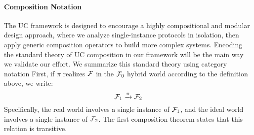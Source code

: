 \paragraph{Composition Notation}
The UC framework is designed to encourage a highly compositional and modular design approach, where we analyze single-instance protocols in isolation, then apply generic composition operators to build more complex systems.
Encoding the standard theory of UC composition in our framework will be the main way we validate our effort. We summarize this standard theory using category notation
First, if $\pi$ realizes $\mathcal{F}$ in the $\mathcal{F}_0$ hybrid world according to the definition above, we write:
\[
	\mathcal{F}_1 \xrightarrow{\pi} \mathcal{F}_2
\]
Specifically, the real world involves a single instance of $\mathcal{F}_1$, and the ideal world involves a single instance of $\mathcal{F}_2$.
The first composition theorem states that this relation is transitive.
